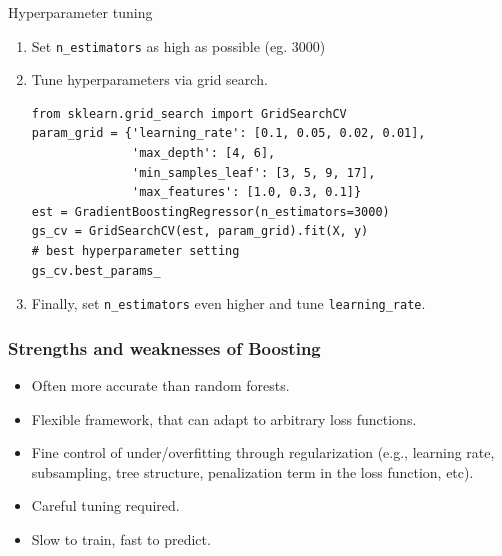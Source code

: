 \documentclass{beamer}
\begin{document}
\begin{frame}[fragile]{Hyperparameter tuning}

\begin{enumerate}
  \item Set \texttt{n\_estimators} as high as possible (eg. $3000$)
  \vspace{0.2cm}
  \item Tune hyperparameters via grid search.

\begin{verbatim}
from sklearn.grid_search import GridSearchCV
param_grid = {'learning_rate': [0.1, 0.05, 0.02, 0.01],
              'max_depth': [4, 6],
              'min_samples_leaf': [3, 5, 9, 17],
              'max_features': [1.0, 0.3, 0.1]}
est = GradientBoostingRegressor(n_estimators=3000)
gs_cv = GridSearchCV(est, param_grid).fit(X, y)
# best hyperparameter setting
gs_cv.best_params_
\end{verbatim}
  \vspace{0.2cm}
  \item Finally, set \texttt{n\_estimators} even higher and tune \texttt{learning\_rate}.

\end{enumerate}
\end{frame}



\begin{frame}
  \frametitle{Strengths and weaknesses of Boosting}

  \begin{itemize}
        \item Often {\color{blue} more accurate} than random forests.

         \vspace{0.25cm}

        \item {\color{blue} Flexible framework}, that can adapt to arbitrary
              loss functions.

        \vspace{0.25cm}

        \item Fine control of under/overfitting through {\color{blue}
              regularization} (e.g., learning rate, subsampling,
              tree structure, penalization term in the loss function, etc).

        \vspace{0.25cm}

        \item {\color{red} Careful tuning} required.

        \vspace{0.25cm}

        \item {\color{red} Slow} to train, {\color{blue} fast} to predict.
  \end{itemize}
\end{frame}
\end{document}

